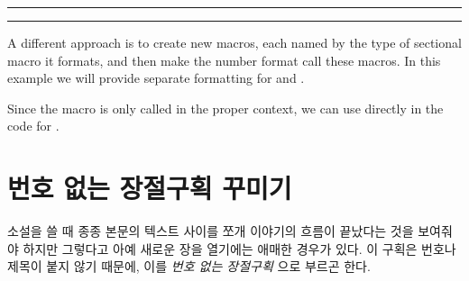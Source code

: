 \fancybreak{$*$}
\fancybreak{}


A different approach is to create new macros, each named by the type
of sectional macro it formats, and then make the number format call
these macros.
In this example we will provide separate formatting for \cmd{\section} and \cmd{\subsection}. 
\begin{lcode}
  \newcommand\sectionsecnumformat{\thesection:\quad} 
  \newcommand\subsectionsecnumformat{\fbox{\enspace\thesubsection\enspace}\enspace}
\end{lcode}
Since the macro is only called in the proper context, we can use
\cmd{\thesection} directly in the code for \cmd{\section}.







\section{번호 없는 장절구획 꾸미기}

소설을 쓸 때 종종 본문의 텍스트 사이를 쪼개
이야기의 흐름이 끝났다는 것을 보여줘야 하지만
그렇다고 아예 새로운 장을 열기에는 애매한 경우가 있다.
이 구획은 번호나 제목이 붙지 않기 때문에,
이를 \emph{번호 없는 장절구획} 
으로 부르곤 한다.
    
